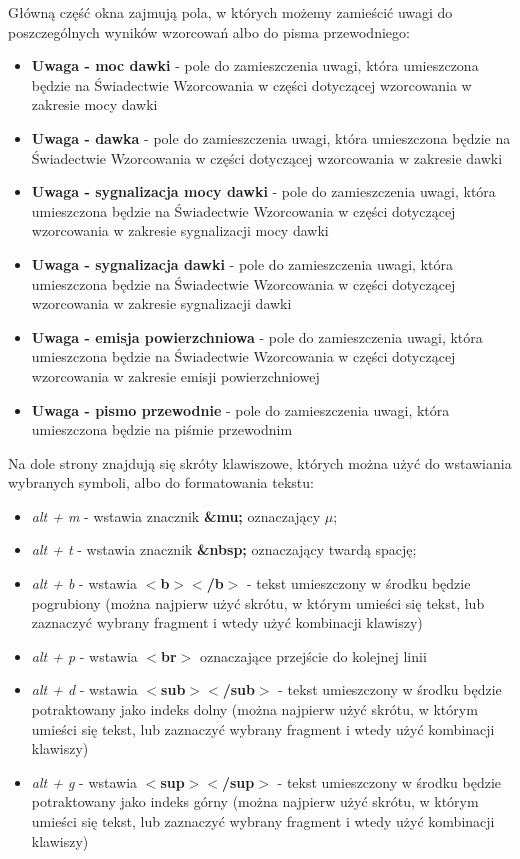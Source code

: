 	Główną część okna zajmują pola, w których możemy zamieścić uwagi do poszczególnych wyników wzorcowań albo do pisma przewodniego:
	\begin{itemize}
		\item \textbf{Uwaga - moc dawki} - pole do zamieszczenia uwagi, która umieszczona będzie na Świadectwie Wzorcowania w części dotyczącej wzorcowania w zakresie mocy dawki
		\item \textbf{Uwaga - dawka} - pole do zamieszczenia uwagi, która umieszczona będzie na Świadectwie Wzorcowania w części dotyczącej wzorcowania w zakresie dawki
		\item \textbf{Uwaga - sygnalizacja mocy dawki} - pole do zamieszczenia uwagi, która umieszczona będzie na Świadectwie Wzorcowania w części dotyczącej wzorcowania w zakresie sygnalizacji mocy dawki
		\item \textbf{Uwaga - sygnalizacja dawki} - pole do zamieszczenia uwagi, która umieszczona będzie na Świadectwie Wzorcowania w części dotyczącej wzorcowania w zakresie sygnalizacji dawki
		\item \textbf{Uwaga - emisja powierzchniowa} - pole do zamieszczenia uwagi, która umieszczona będzie na Świadectwie Wzorcowania w części dotyczącej wzorcowania w zakresie emisji powierzchniowej
		\item \textbf{Uwaga - pismo przewodnie} - pole do zamieszczenia uwagi, która umieszczona będzie na piśmie przewodnim
	\end{itemize}

	Na dole strony znajdują się skróty klawiszowe, których można użyć do wstawiania wybranych symboli, albo do formatowania tekstu:
	\begin{itemize}
		\item\textit{alt + m} - wstawia znacznik \textbf{\&mu;} oznaczający  $\mu$;
		\item\textit{alt + t} - wstawia znacznik \textbf{\&nbsp;} oznaczający twardą spację;
		\item\textit{alt + b} - wstawia \textbf{$<$b$>$$<$/b$>$} - tekst umieszczony w środku będzie pogrubiony (można najpierw użyć skrótu, w którym umieści się tekst, lub zaznaczyć wybrany fragment i wtedy użyć kombinacji klawiszy)
		\item\textit{alt + p} - wstawia \textbf{$<$br$>$} oznaczające przejście do kolejnej linii
		\item\textit{alt + d} - wstawia \textbf{$<$sub$>$$<$/sub$>$} - tekst umieszczony w środku będzie potraktowany jako indeks dolny (można najpierw użyć skrótu, w którym umieści się tekst, lub zaznaczyć wybrany fragment i wtedy użyć kombinacji klawiszy)
		\item\textit{alt + g} - wstawia \textbf{$<$sup$>$$<$/sup$>$} - tekst umieszczony w środku będzie potraktowany jako indeks górny (można najpierw użyć skrótu, w którym umieści się tekst, lub zaznaczyć wybrany fragment i wtedy użyć kombinacji klawiszy)
	\end{itemize}

